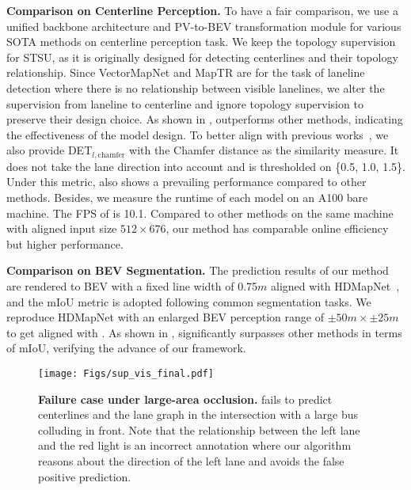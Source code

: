 \smallskip
\noindent
\textbf{Comparison on Centerline Perception.} 
To have a fair comparison, we use a unified backbone architecture and PV-to-BEV transformation module for various SOTA methods on centerline perception task.
We keep the topology supervision for STSU, as it is originally designed for detecting centerlines and their topology relationship.
Since VectorMapNet and MapTR are for the task of laneline detection where there is no relationship between visible lanelines, we alter the supervision from laneline to centerline and ignore topology supervision to preserve their design choice.
As shown in , \algname outperforms other methods, indicating the effectiveness of the model design.
To better align with previous works~\cite{liu2022vectormapnet, liao2023maptr}, we also provide DET$_{l,\text{chamfer}}$ with the Chamfer distance as the similarity measure.
It does not take the lane direction into account and is thresholded on \{0.5, 1.0, 1.5\}.
Under this metric, \algname also shows a prevailing performance compared to other methods.
Besides, we measure the runtime of each model on an A100 bare machine.
The FPS of \algname is 10.1. Compared to other methods on the same machine with aligned input size $512\!\times676$, our method has comparable online efficiency but higher performance.


\smallskip
\noindent
\textbf{Comparison on BEV Segmentation.} 
The prediction results of our method are rendered to BEV with a fixed line width of 0.75$m$ aligned with HDMapNet~\cite{li2021hdmapnet}, and the mIoU metric is adopted following common segmentation tasks. 
We reproduce HDMapNet with an enlarged BEV perception range of $\pm50\textit{m} \times \pm25\textit{m}$ to get aligned with \algname.
As shown in , \algname significantly surpasses other methods in terms of mIoU, verifying the advance of our framework.


\begin{figure*}[t!]
  \centering
    \texttt{[image: Figs/sup\_vis\_final.pdf]}
     \vspace{-15pt}
  \caption{
  \textbf{Failure case under large-area occlusion.} \algname fails to predict centerlines and the lane graph in the intersection with a large bus colluding in front. Note that the relationship between the left lane and the red light is an incorrect annotation where our algorithm reasons about the direction of the left lane and avoids the false positive prediction.
  }
  \label{fig:supp-vis-occlusion}
\end{figure*}


